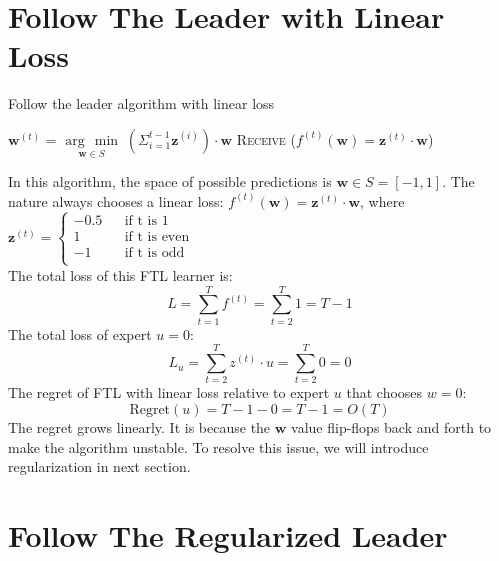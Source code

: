 \documentclass[11pt]{article}
\newcommand{\argmin}[1]{\underset{#1}{\operatorname{arg}\,\operatorname{min}}\;}
\begin{document}
\section{Follow The Leader with Linear Loss}
\label{sec:ftl_linear_loss}

\begin{algorithm}
  \caption{Follow the leader algorithm with linear loss}\label{euclid}
  \begin{algorithmic}[1]
            \State $\bm{w}^{(t)}$ = $\argmin{\bm{w} \in S} \left(\Sigma^{t-1}_{i=1} \bm{z}^{(i)}\right) \cdot \bm{w}$ 
            \State \textsc{Receive} ($f^{(t)}(\bm{w}) = \bm{z}^{(t)} \cdot \bm{w}$) 
        \EndFor
    \EndFunction
  \end{algorithmic}
\end{algorithm}
In this algorithm, the space of possible predictions is $\bm{w} \in S = [-1, 1]$. The nature always chooses a linear loss: $f^{(t)}(\bm{w}) = \bm{z}^{(t)} \cdot \bm{w}$, where $\bm{z}^{(t)} =\left\{
\begin{array}{rcl}
-0.5       &      & \text{if t is 1}\\
1     &      & \text{if t is even}\\
-1     &      & \text{if t is odd}\\
\end{array} \right. $\\
The total loss of this FTL learner is:\\
\begin{equation*}
    L = \sum_{t=1}^T f^{(t)} = \sum_{t=2}^T 1 = T -1
\end{equation*}
The total loss of expert $u=0$:\\
\begin{equation*}
    L_u = \sum_{t=2}^T z^{(t)} \cdot u = \sum_{t=2}^T 0= 0
\end{equation*}
The regret of FTL with linear loss relative to expert $u$ that chooses $w=0$:\\
\begin{equation*}
    \text{Regret}(u) = T-1-0 = T-1 = O(T)
\end{equation*}
The regret grows linearly. It is because the $\bm{w}$ value flip-flops back and forth to make the algorithm unstable. To resolve this issue, we will introduce regularization in next section. 


\section{Follow The Regularized Leader}
\end{document}

